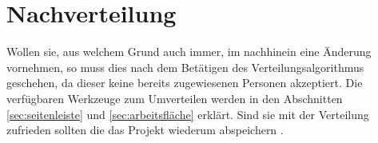\section{Nachverteilung}
\label{sec:nachverteilung}

Wollen sie, aus welchem Grund auch immer, im nachhinein eine Änderung vornehmen, so muss dies nach dem Betätigen des Verteilungsalgorithmus geschehen, da dieser keine bereits zugewiesenen Personen akzeptiert. Die verfügbaren Werkzeuge zum Umverteilen werden in den Abschnitten \ref{sec:seitenleiste} und \ref{sec:arbeitsfläche} erklärt. Sind sie mit der Verteilung zufrieden sollten die das Projekt wiederum abspeichern .
